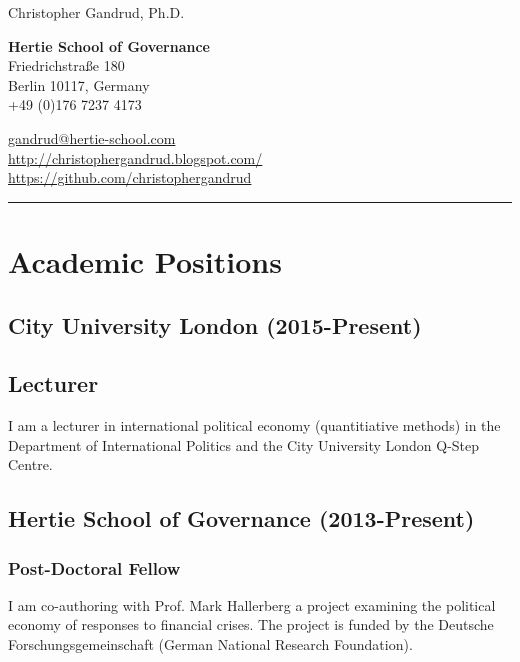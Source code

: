 \documentclass[a4paper]{article}
\begin{document}
\begin{flushright}
    {\huge{Christopher Gandrud, Ph.D.}} \\
    \vspace{0.25cm}

    {\bf{\large{Hertie School of Governance}}} \\
    Friedrichstra{\ss}e 180\\
    Berlin 10117, Germany \\
    +49 (0)176 7237 4173 \\
    \vspace{0.25cm}

    \href{mailto:gandrud@hertie-school.com}{gandrud@hertie-school.com}\\
    \url{http://christophergandrud.blogspot.com/} \\
    \url{https://github.com/christophergandrud}\\
    [0.25cm]
\end{flushright}
\medskip\hrule height 1pt
\vspace{1cm}

\section*{Academic Positions}

\subsection*{City University London (2015-Present)}

\subsection*{Lecturer}

I am a lecturer in international political economy (quantitiative methods) in the Department of International Politics and the City University London Q-Step Centre.

\subsection*{Hertie School of Governance (2013-Present)}

\subsubsection*{Post-Doctoral Fellow}

I am co-authoring with Prof. Mark Hallerberg a project examining the political economy of responses to financial crises. The project is funded by the Deutsche Forschungsgemeinschaft (German National Research Foundation).\vspace{0.25cm}
\end{document}
